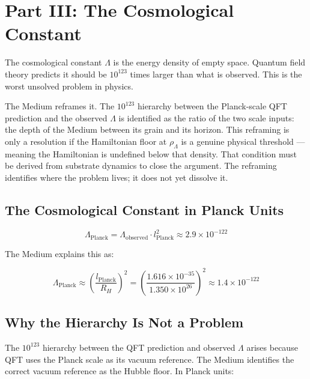 \documentclass[11pt,letterpaper]{article}
\newenvironment{plainbox}{\begin{tcolorbox}[colback=blue!3!white,colframe=blue!40!white,title={\small\textit{In plain language}},breakable]}{\end{tcolorbox}}
\begin{document}
\section{Part III: The Cosmological Constant}
\label{sec:orgdb629b6}

\begin{plainbox}
The cosmological constant $\Lambda$ is the energy density of empty space. Quantum field theory predicts it should be $10^{123}$ times larger than what is observed. This is the worst unsolved problem in physics.

The Medium reframes it. The \(10^{123}\) hierarchy between the Planck-scale QFT prediction and the observed \(\Lambda\) is identified as the ratio of the two scale inputs: the depth of the Medium between its grain and its horizon. This reframing is only a resolution if the Hamiltonian floor at \(\rho_\Lambda\) is a genuine physical threshold --- meaning the Hamiltonian is undefined below that density. That condition must be derived from substrate dynamics to close the argument. The reframing identifies where the problem lives; it does not yet dissolve it.
\end{plainbox}

\subsection{The Cosmological Constant in Planck Units}
\label{sec:org01e0f0c}

\begin{equation}
\Lambda_\text{Planck} = \Lambda_\text{observed} \cdot l_\text{Planck}^2 \approx 2.9 \times 10^{-122}
\end{equation}

The Medium explains this as:

\begin{equation}
\Lambda_\text{Planck} \approx \left(\frac{l_\text{Planck}}{R_H}\right)^2 = \left(\frac{1.616\times10^{-35}}{1.350\times10^{26}}\right)^2 \approx 1.4 \times 10^{-122}
\end{equation}

\subsection{Why the Hierarchy Is Not a Problem}
\label{sec:orged27db8}

The \(10^{123}\) hierarchy between the QFT prediction and observed \(\Lambda\) arises because QFT uses the Planck scale as its vacuum reference. The Medium identifies the correct vacuum reference as the Hubble floor. In Planck units:
\end{document}
